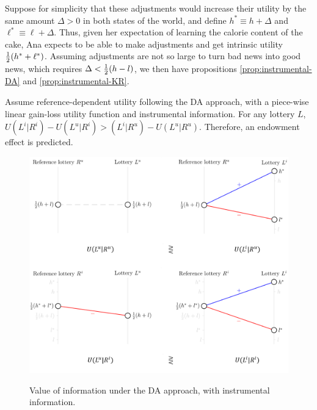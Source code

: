 Suppose for simplicity that these adjustments would increase their utility by the same amount $\Delta > 0$ in both states of the world, and define $h^* \equiv h+\Delta$ and $\ell^* \equiv \ell+\Delta$. Thus, given her expectation of learning the calorie content of the cake, Ana expects to be able to make adjustments and get intrinsic utility $\tfrac{1}{2}(h^*+\ell^*)$. Assuming adjustments are not so large to turn bad news into good news, which requires $\Delta <\tfrac{1}{2}(h-l)$, we then have propositions \ref{prop:instrumental-DA} and \ref{prop:instrumental-KR}.

\begin{prop}
  Assume reference-dependent utility following the DA approach, with a piece-wise linear gain-loss utility function and instrumental information. For any lottery $L$, $U(L^i|R^i)-U(L^u|R^i)>(L^i|R^u)-U(L^u|R^u)$. Therefore, an endowment effect is predicted.
  \label{prop:instrumental-DA}
\end{prop}

\begin{figure}[ht]
  \caption{Value of information under the DA approach, with instrumental information.}\label{fig:instrumental-DA}
  \begin{center}
  {\includegraphics[width=1\textwidth]{./figures/theory_fig3.png}}
  \end{center}
\end{figure}

